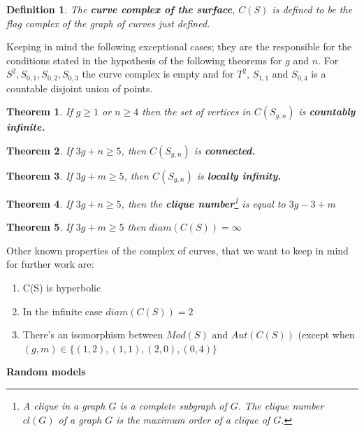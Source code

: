 \documentclass[a4paper]{tufte-handout}
\newtheorem{theorem}{Theorem}[section]
\newtheorem{defini}{Definition}[theorem]
\begin{document}
\begin{defini}
The \textbf{curve complex of the surface}, $C(S)$ is defined to be the flag complex of the graph of curves just defined.
\end{defini}

Keeping in mind the following exceptional cases; they are the responsible for the conditions stated in the hypothesis of the following theorems for $g$ and $n$. For $ S^2, S_{0,1}, S _{0,2}, S_{0,3} $ the curve complex is empty and for  $ T^{2} $, $ S_{1,1}$ and $ S_{0,4}$ is a countable disjoint union of points.

\begin{theorem}
If $g\geq 1$ or $n\geq 4$ then the set of vertices in $C(S_{g,n})$ is \textbf{countably infinite.}
\end{theorem}

\begin{theorem}
If $3g+n\geq 5$, then $C(S_{g,n})$ is \textbf{connected.}
\end{theorem}

\begin{theorem}
If $3g+m\geq 5$, then $C(S_{g,n})$ is \textbf{locally infinity.}
\end{theorem}

\begin{theorem}
If $3g+n\geq 5$, then the \textbf{clique number}\footnote{A clique in a graph $G$ is a complete subgraph of $G$. The clique number $cl(G)$ of a graph $G$ is the maximum order of a clique of $G$.} is equal to $3g - 3 + m$
\end{theorem}

\begin{theorem}
If $3g+m\geq 5$ then $diam(C(S)) = \infty$
\end{theorem}
\clearpage

Other known properties of the complex of curves, that we want to keep in mind for further work are:

\begin{enumerate}
\item C(S) is hyperbolic
\item In the infinite case $diam(C(S))= 2$
\item There's an isomorphism between $Mod(S)$ and $Aut(C(S))$ (except when $(g,m) \in \{(1,2), (1,1), (2,0), (0,4)\}$
\end{enumerate}
\noindent\hrulefill

{\Large \noindent \textbf{Random models}}
\end{document}
